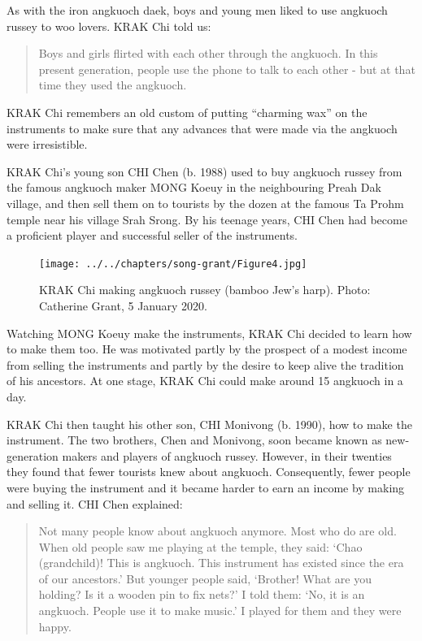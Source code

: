\documentclass[twoside]{article}
\begin{document}
As with the iron angkuoch daek, boys and young men liked to use angkuoch
russey to woo lovers. KRAK Chi told us:

\begin{quote}
Boys and girls flirted with each other through the angkuoch. In this
present generation, people use the phone to talk to each other - but at
that time they used the angkuoch.
\end{quote}

KRAK Chi remembers an old custom of putting ``charming wax'' on the
instruments to make sure that any advances that were made via the
angkuoch were irresistible.

KRAK Chi's young son CHI Chen (b. 1988) used to buy angkuoch russey from
the famous angkuoch maker MONG Koeuy in the neighbouring Preah Dak
village, and then sell them on to tourists by the dozen at the famous Ta
Prohm temple near his village Srah Srong. By his teenage years, CHI Chen
had become a proficient player and successful seller of the instruments.

\begin{figure}
  \texttt{[image: ../../chapters/song-grant/Figure4.jpg]}
  \caption{KRAK Chi making angkuoch russey (bamboo Jew's harp). Photo: Catherine Grant, 5 January 2020.}
\end{figure}

Watching MONG Koeuy make the instruments, KRAK Chi decided to learn how
to make them too. He was motivated partly by the prospect of a modest
income from selling the instruments and partly by the desire to keep
alive the tradition of his ancestors. At one stage, KRAK Chi could make
around 15 angkuoch in a day.

KRAK Chi then taught his other son, CHI Monivong (b. 1990), how to make
the instrument. The two brothers, Chen and Monivong, soon became known
as new-generation makers and players of angkuoch russey. However, in
their twenties they found that fewer tourists knew about angkuoch.
Consequently, fewer people were buying the instrument and it became
harder to earn an income by making and selling it. CHI Chen explained:

\begin{quote}
Not many people know about angkuoch anymore. Most who do are old. When​
old people saw me playing at the temple, they said: `Chao (grandchild)!
This is angkuoch. This instrument has existed since the era of our
ancestors.' But younger people said, `Brother! What are you holding? Is
it a wooden pin to fix nets?' I told them: `No, it is an angkuoch.
People use it to make music.' I played for them and they were happy.
\end{quote}
\end{document}
